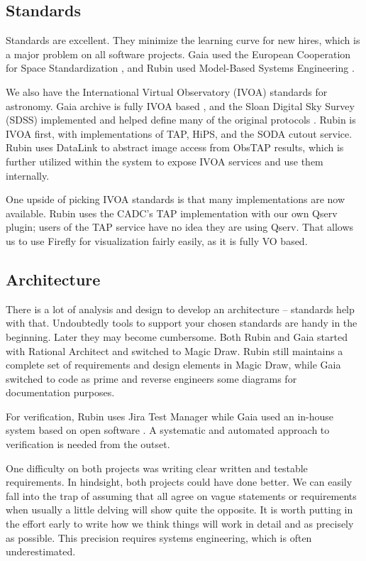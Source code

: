 \documentclass[11pt,twoside]{article}
\begin{document}
\subsection{Standards}
Standards are excellent. They minimize the learning curve for new hires, which is a major problem on all software projects.
Gaia used the European Cooperation for Space Standardization \citep[ECSS;][]{2008ASPC..394..191O}, and
 Rubin used Model-Based Systems Engineering \citep[MBSE;][]{2018SPIE10705E..0US}.

We also have the International Virtual Observatory (IVOA) standards for astronomy. Gaia archive is fully IVOA based \citep{2019ASPC..523..445S,2015scop.confE...8G}, and the Sloan Digital Sky Survey (SDSS) implemented and helped define many of the original protocols \citep{2005ASPC..347..684T}.
Rubin is IVOA first, with implementations of TAP, HiPS, and the SODA cutout service.
Rubin uses DataLink to abstract image access from ObsTAP results, which is further utilized within the system to expose IVOA services and use them internally.

One upside of picking IVOA standards is that many implementations are now available.
Rubin uses the CADC's TAP implementation with our own Qserv plugin; users of the TAP service have no idea they are using Qserv.
That allows us to use Firefly for visualization fairly easily, as it is
fully VO based.

\subsection{Architecture}
There is a lot of analysis and design to develop an architecture -- standards help with that.
Undoubtedly tools to support your chosen standards are handy in the beginning. Later they may become cumbersome. Both Rubin and Gaia started with Rational Architect and switched to Magic Draw.
Rubin still maintains a complete set of requirements and design elements in Magic Draw, while Gaia switched to code as prime and reverse engineers some diagrams for documentation purposes.

For verification, Rubin uses Jira Test Manager \citep{2018SPIE10705E..0US} while Gaia used an in-house system based on open software \citep{2012SPIE.8449E..0GC}.
A systematic and automated approach to verification is needed from the outset.

One difficulty on both projects was writing clear written and testable requirements. In hindsight, both projects could have done better.
We can easily fall into the trap of assuming that all agree on vague statements or requirements when usually a little delving will show quite the opposite.
It is worth putting in the effort early to write how we think things will work in detail and as precisely as possible.
This precision requires systems engineering, which is often underestimated.
\end{document}

